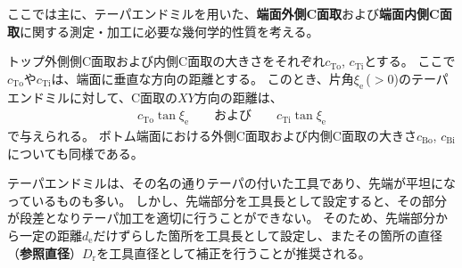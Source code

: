 

ここでは主に、テーパエンドミルを用いた、\textbf{端面外側C面取}および\textbf{端面内側C面取}に関する測定・加工に必要な幾何学的性質を考える。



トップ外側側C面取および内側C面取の大きさをそれぞれ$c_\mathrm{To}$, $c_\mathrm{Ti}$とする。
ここで$c_\mathrm{To}$や$c_\mathrm{Ti}$は、端面に垂直な方向の距離とする。
このとき、片角$\xi_\mathrm e$\,($>0$)のテーパエンドミルに対して、C面取の$XY$方向の距離は、
\begin{align*}
  c_\mathrm{To}\tan\xi_\mathrm e\qquad\text{および}\qquad c_\mathrm{Ti}\tan\xi_\mathrm e
\end{align*}
で与えられる。
ボトム端面における外側C面取および内側C面取の大きさ$c_\mathrm{Bo}$, $c_\mathrm{Bi}$についても同様である。



テーパエンドミルは、その名の通りテーパの付いた工具であり、先端が平坦になっているものも多い。
しかし、先端部分を工具長として設定すると、その部分が段差となりテーパ加工を適切に行うことができない。
そのため、先端部分から一定の距離$d_\mathrm e$だけずらした箇所を工具長として設定し、またその箇所の直径（\textbf{参照直径}）$D_\mathrm r$を工具直径として補正を行うことが推奨される。

